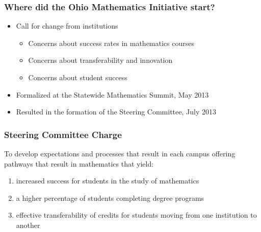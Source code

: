 \documentclass[13pt]{beamer}
\newcounter{a}
\newcounter{b}
\begin{document}
\begin{frame}
  \frametitle{Where did the Ohio Mathematics Initiative start?}

  \begin{itemize}
  \item Call for change from institutions
    \begin{itemize}
      \item Concerns about success rates in mathematics courses
      \item Concerns about transferability and innovation
      \item Concerns about student success
    \end{itemize}
  \item Formalized at the Statewide Mathematics Summit, 
    May 2013
  \item Resulted in the formation of the Steering Committee,
    July 2013
  \end{itemize}
\end{frame}

\begin{frame}
  \frametitle{Steering Committee Charge}
  
  To develop expectations and processes that result in each campus offering pathways that result in mathematics that yield:
  \begin{enumerate}
    \item increased success for students in the study of mathematics
    \item a higher percentage of students completing degree     
      programs
    \item effective transferability of credits for students moving 
      from one institution to another
  \end{enumerate}
  
\end{frame}
\end{document}
